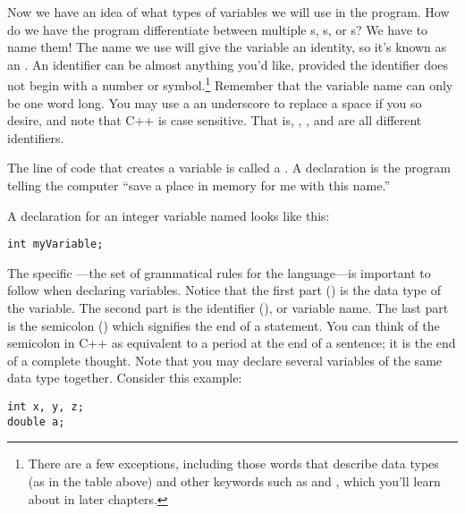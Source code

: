 
Now we have an idea of what types of variables we will use in the program. 
How do we have the program differentiate between multiple s, s, or s? 
We have to name them! 
The name we use will give the variable an identity, so it's known as an . 
An identifier can be almost anything you'd like, provided the identifier does not begin with a number or symbol.\footnote{There are a few exceptions, including those words that describe data types (as in the table above) and other keywords such as  and , which you'll learn about in later chapters.} 
Remember that the variable name can only be one word long. 
You may use a an underscore to replace a space if you so desire, and note that C++ is case sensitive. 
That is, , , and  are all different identifiers.


The line of code that creates a variable is called a . 
A declaration is the program telling the computer ``save a place in memory for me with this name.'' 

A declaration for an integer variable named  looks like this:

\noindent\begin{minipage}{\linewidth}\begin{lstlisting}
int myVariable;
\end{lstlisting}\end{minipage}

The specific ---the set of grammatical rules for the language---is important to follow when declaring variables.
Notice that the first part () is the data type of the variable.
The second part is the identifier (), or variable name. 
The last part is the semicolon (\Code{;}) which signifies the end of a statement. 
You can think of the semicolon in C++ as equivalent to a period at the end of a sentence; it is the end of a complete thought. 
Note that you may declare several variables of the same data type together.  Consider this example: \nopagebreak[4]

\noindent\begin{minipage}{\linewidth}\begin{lstlisting}
int x, y, z;
double a;
\end{lstlisting}\end{minipage}

